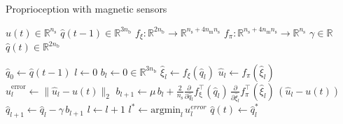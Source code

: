 \begin{algorithm}[ht!]
\caption{Proprioception with magnetic sensors}\label{alg:promasens:proprioception}
\begin{algorithmic}[1]
    \Require $u(t) \in \mathbb{R}^{n_\mathrm{s}}$ 
    \Require  $\hat{q}(t-1) \in \mathbb{R}^{3n_\mathrm{b}}$
    \Require $f_\xi: \mathbb{R}^{2n_\mathrm{b}} \rightarrow \mathbb{R}^{n_\mathrm{s} + 4n_\mathrm{m} n_\mathrm{s}}$ 
    \Require $f_\pi: \mathbb{R}^{n_\mathrm{s} + 4n_\mathrm{m} n_\mathrm{s}} \rightarrow \mathbb{R}^{n_\mathrm{s}}$ 
    \Require $\gamma \in \mathbb{R}$ 
    \Ensure $\hat{q}(t) \in \mathbb{R}^{2n_\mathrm{b}}$ 
    
    \State $\hat{q}_0 \gets \hat{q}(t-1)$
    \vspace{0.25em}
    \State $l \gets 0$
    \State $b_l \gets 0 \in \mathbb{R}^{3n_\mathrm{b}}$
    \vspace{0.25em}
        \vspace{0.25em}
        \State $\hat{\xi}_l \gets f_{\xi}(\hat{q}_{l})$
        \vspace{0.25em}
        \State $\hat{u}_l \gets f_\pi(\hat{\xi}_l)$
        \vspace{0.25em}
        \State $\hat u_{l}^{\mathrm{error}} \gets \lVert \hat{u}_{l}-u(t) \rVert_2$
        \vspace{0.25em}
        \State $b_{l+1} \gets \mu \, b_l + \frac{2}{n_\mathrm{s}} \frac{\partial }{\partial {\hat{q}_l}} f_{\mathrm{\xi}}^\top(\hat{q}_l) \, \frac{\partial}{\partial {\hat{\xi}_l}} f_\pi^\top(\hat{\xi}_l) \, (\hat{u}_l - u(t))$
        \State $\hat{q}_{l+1} \gets \hat{q}_l - \gamma \, b_{l+1} $
        \vspace{0.25em}
        \State $l \gets l + 1$
    \EndWhile
    \State $l^* \gets \mathrm{argmin}_{l} \, u_{l}^{error}$
    \State $\hat{q}(t) \gets \hat{q}_l^{*}$
\end{algorithmic}
\end{algorithm}

